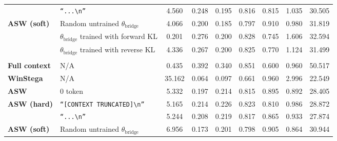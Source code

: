 \begin{table}[!t]
{\begin{tabular}{l|l|cccc|c|cc}
                        & \texttt{``...\textbackslash n''}                             &  4.560    &   0.248    &   0.195    &     0.816      &         0.815              &     1.035    &       30.505               \\ \cline{1-9}
\multirow{3}{*}{\textbf{ASW (soft)}}   & Random untrained  $\theta_{\text{bridge}}$                           &  4.066    &   0.200    &   0.185    &    0.797       &    0.910      &     0.980    &    31.819                  \\
                        & $\theta_{\text{bridge}}$ trained with forward KL                       & 0.201    & 0.276    &  0.200     & 0.828           &     0.745                  &   1.606      &     32.594                 \\
                        & $\theta_{\text{bridge}}$ trained with reverse KL                      &  4.336    &   0.267    &    0.200    &    0.825       &       0.770                &    1.124     & 31.499   \\ \hline \rowcolor{blue!8}
\multicolumn{9}{c}{databricks-dolly-15k~\cite{DatabricksBlog2023DollyV2}} \\  \hline \rowcolor{gray!20}
\textbf{Full context}            & N/A    &  0.435   &   0.392   &  0.340   &     0.851     &  0.600            &   0.960   &  50.517 \\  \hline
\textbf{WinStega}                & N/A                                  &  35.162    &  0.064     &   0.097    &    0.661      &        0.960            &   2.996    &  22.549               \\ \hline
  \textbf{ASW}  & 0 token        &   5.332   &   0.197    &  0.214    &   0.815        &     0.895         &   0.892     &    28.405                                     \\  \hline
          \multirow{2}{*}{\textbf{ASW (hard)}}              & \texttt{``[CONTEXT TRUNCATED]\textbackslash n''}                             &   5.165   &    0.214   &   0.226    &    0.823      &         0.810           &   0.986    &   28.872           \\
                        & \texttt{``...\textbackslash n''}                             &  5.244   &  0.208   &   0.219  &    0.817     &      0.865        &       0.933  &   27.874                  \\ \cline{1-9}
\multirow{3}{*}{\textbf{ASW (soft)}}   & Random untrained  $\theta_{\text{bridge}}$                           &  6.956   &  0.173   &   0.201  &  0.798       &          0.905             &      0.864   &   30.944               \\

\end{tabular}}
\end{table}
